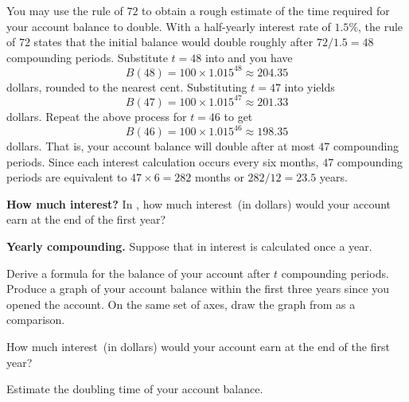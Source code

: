 \documentclass[a4paper,oneside,12pt]{article}
\begin{document}
\begin{solution}
You may use the rule of $72$ to obtain a rough estimate of the time
required for your account balance to double.  With a half-yearly
interest rate of $1.5\%$, the rule of $72$ states that the initial
balance would double roughly after $72 / 1.5 = 48$ compounding
periods.  Substitute $t = 48$ into
 and you have
\[
B(48)
=
100 \times 1.015^{48}
\approx
204.35
\]
dollars, rounded to the nearest cent.  Substituting $t = 47$ into
 yields
\[
B(47)
=
100 \times 1.015^{47}
\approx
201.33
\]
dollars.  Repeat the above process for $t = 46$ to get
\[
B(46)
=
100 \times 1.015^{46}
\approx
198.35
\]
dollars.  That is, your account balance will double after at most
$47$ compounding periods.  Since each interest calculation occurs
every six months, $47$ compounding periods are equivalent to
$47 \times 6 = 282$ months or $282 / 12 = 23.5$ years.
\end{solution}

\begin{exercise}
\textbf{How much interest?}
In , how much interest~(in
dollars) would your account earn at the end of the first year?
\end{exercise}


\begin{exercise}
\label{ex:exponential:savings_once_annually}
\textbf{Yearly compounding.}
Suppose that in  interest is
calculated once a year.
\begin{packedenum}
\item\label{subex:exponential:savings_1year_formula}
  Derive a formula for the balance of your account after $t$
  compounding periods.  Produce a graph of your account balance within
  the first three years since you opened the account.  On the same set
  of axes, draw the graph from
  as a comparison.

\item\label{subex:exponential:savings_1year_interest}
  How much interest~(in dollars) would your account earn at the end of
  the first year?

\item\label{subex:exponential:savings_1year_doubling_time}
  Estimate the doubling time of your account balance.
\end{packedenum}
\end{exercise}
\end{document}
